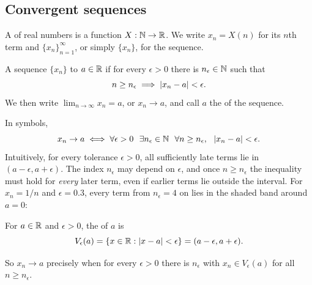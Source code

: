 \subsection{Convergent sequences}
\begin{defi}[Sequence]
  A  of real numbers is a function $X : \mathbb{N} \to \mathbb{R}$. We write
  $x_n = X(n)$ for its $n$th term and $\{x_n\}_{n=1}^{\infty}$, or simply
  $\{x_n\}$, for the sequence.
\end{defi}

\begin{defi}[Convergence]
  A sequence $\{x_n\}$  to $a \in \mathbb{R}$ if for every
  $\epsilon > 0$ there is $n_\epsilon \in \mathbb{N}$ such that
  \[
    n \geq n_\epsilon \implies \left\lvert x_n - a\right\rvert < \epsilon.
  \]
  We then write $\lim_{n \to \infty} x_n = a$, or $x_n \to a$, and call $a$
  the  of the sequence.
\end{defi}
In symbols,
\[
  x_n \to a \iff \forall \epsilon > 0\ \ \exists n_\epsilon \in \mathbb{N}\ \ \forall n \geq n_\epsilon,\ \ \left\lvert x_n - a\right\rvert < \epsilon.
\]
Intuitively, for every tolerance $\epsilon > 0$, all sufficiently late terms
lie in $(a - \epsilon, a + \epsilon)$. The index $n_\epsilon$ may depend on
$\epsilon$, and once $n \geq n_\epsilon$ the inequality must hold for
\emph{every} later term, even if earlier terms lie outside the interval. For
$x_n = 1/n$ and $\epsilon = 0.3$, every term from $n_\epsilon = 4$ on lies in
the shaded band around $a = 0$:
\begin{center}
\end{center}

\begin{defi}
  For $a \in \mathbb{R}$ and $\epsilon > 0$, the  of
  $a$ is
  \[
    V_\epsilon(a) = \{x \in \mathbb{R} : \left\lvert x - a\right\rvert < \epsilon\} = (a - \epsilon, a + \epsilon).
  \]
\end{defi}
So $x_n \to a$ precisely when for every $\epsilon > 0$ there is $n_\epsilon$
with $x_n \in V_\epsilon(a)$ for all $n \geq n_\epsilon$.

